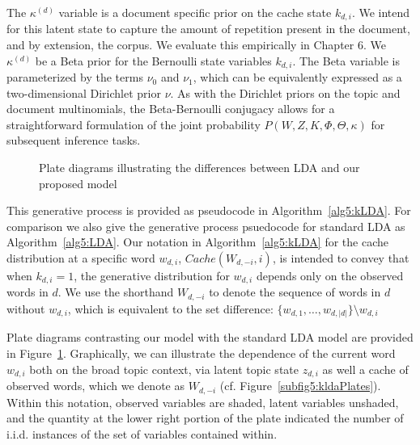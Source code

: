 The $\kappa^{(d)}$ variable is a document specific prior on the cache state $k_{d,i}$.  We intend for this latent state to capture the amount of repetition present in the document, and by extension, the corpus.  We evaluate this empirically in Chapter 6.  We $\kappa^{(d)}$ be a Beta prior  for the Bernoulli state variables $k_{d,i}$.  The Beta variable is parameterized by the terms $\nu_0$ and $\nu_1$, which can be equivalently expressed as a two-dimensional Dirichlet prior $\nu$.  As with the Dirichlet priors on the topic and document multinomials, the Beta-Bernoulli conjugacy allows for a straightforward formulation of the joint probability $P(W,Z,K,\Phi,\Theta,\kappa)$ for subsequent inference tasks. %

\begin{figure}[t]
\begin{center}
\hfill
{}
\end{center}
\caption[Plate diagrams for LDA and $\kappa$LDA]{Plate diagrams illustrating the differences between LDA and our proposed model\label{fig5:plates}}
\end{figure}

This generative process is provided as pseudocode in Algorithm~\ref{alg5:kLDA}.  For comparison we also give the generative process psuedocode for standard LDA as Algorithm~\ref{alg5:LDA}.  Our notation in Algorithm~\ref{alg5:kLDA} for the cache distribution at a specific word $w_{d,i}$, $Cache(W_{d,-i},i)$, is intended to convey that when $k_{d,i}=1$, the generative distribution for $w_{d,i}$ depends only on the observed words in $d$.  We use the shorthand $W_{d,-i}$ to denote the sequence of words in $d$ without $w_{d,i}$, which is equivalent to the set difference: $\{w_{d,1},\ldots,w_{d,|d|}\} \setminus w_{d,i}$ 

Plate diagrams contrasting our model with the standard LDA model are provided in Figure~\ref{fig5:plates}.  Graphically, we can illustrate the dependence of the current word $w_{d,i}$ both on the broad topic context, via latent topic state $z_{d,i}$ as well a cache of observed words, which we denote as $W_{d,-i}$ (cf. Figure~\ref{subfig5:kldaPlates}).  Within this notation, observed variables are shaded, latent variables unshaded, and the quantity at the lower right portion of the plate indicated the number of i.i.d. instances of the set of variables contained within.

